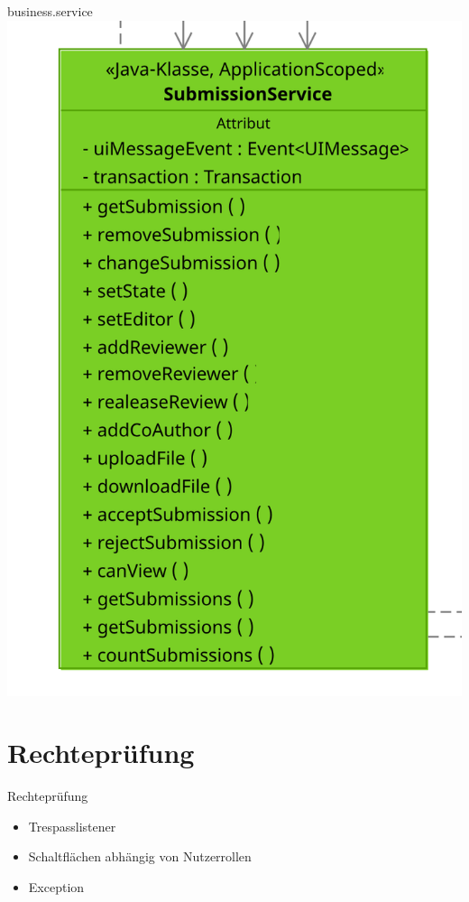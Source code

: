 \documentclass{beamer}
\begin{document}
    \begin{frame}{business.service}
        \centering
        \includegraphics[height=0.9\textheight]{excerpts/SubmissionService}
    \end{frame}

    \section{Rechteprüfung}

    \begin{frame}{Rechteprüfung}
        \begin{itemize}
            \item Trespasslistener \pause
            \item Schaltflächen abhängig von Nutzerrollen \pause
            \item Exception
        \end{itemize}
    \end{frame}
\end{document}
